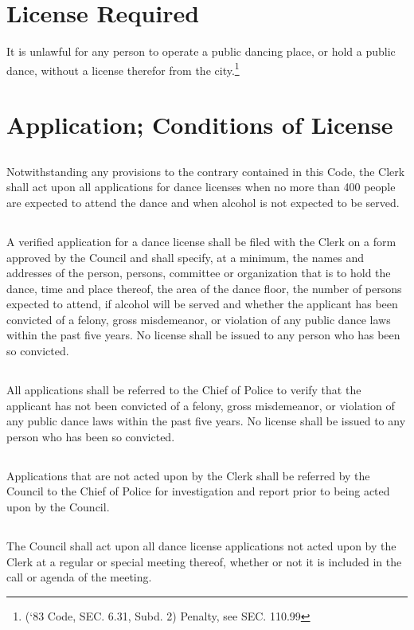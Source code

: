 \section{License Required}
It is unlawful for any person to operate a public dancing place, or hold a public dance, without a license therefor from the city.\footnote{(‘83 Code, SEC. 6.31, Subd. 2)  Penalty, see SEC. 110.99}

\section{Application; Conditions of License}
\subsection{}
Notwithstanding any provisions to the contrary contained in this Code, the Clerk shall act upon all applications for dance licenses when no more than 400 people are expected to attend the dance and when alcohol is not expected to be served.
\subsection{}
A verified application for a dance license shall be filed with the Clerk on a form approved by the Council and shall specify, at a minimum, the names and addresses of the person, persons, committee or organization that is to hold the dance, time and place thereof, the area of the dance floor, the number of persons expected to attend, if alcohol will be served and whether the applicant has been convicted of a felony, gross misdemeanor, or violation of any public dance laws within the past five years.  No license shall be issued to any person who has been so convicted.
\subsection{}
All applications shall be referred to the Chief of Police to verify that the applicant has not been convicted of a felony, gross misdemeanor, or violation of any public dance laws within the past five years.  No license shall be issued to any person who has been so convicted.
\subsection{}
Applications that are not acted upon by the Clerk shall be referred by the Council to the Chief of Police for investigation and report prior to being acted upon by the Council.
\subsection{}
The Council shall act upon all dance license applications not acted upon by the Clerk at a regular or special meeting thereof, whether or not it is included in the call or agenda of the meeting.
